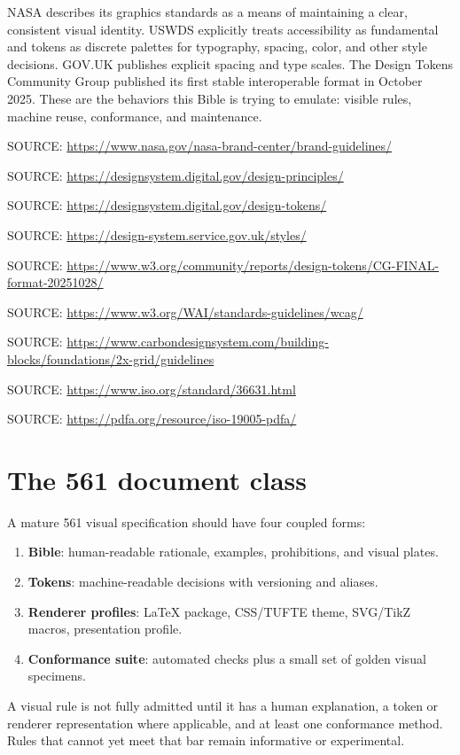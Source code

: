 \documentclass[11pt,twoside,openany]{report}
\newcommand{\Source}[1]{\par{\FSOEvidence\fontsize{7}{9}\selectfont\color{FSOInkSoft}SOURCE: \url{#1}}}
\begin{document}
\begin{evidencebox}
NASA describes its graphics standards as a means of maintaining a clear, consistent visual identity. USWDS explicitly treats accessibility as fundamental and tokens as discrete palettes for typography, spacing, color, and other style decisions. GOV.UK publishes explicit spacing and type scales. The Design Tokens Community Group published its first stable interoperable format in October 2025. These are the behaviors this Bible is trying to emulate: visible rules, machine reuse, conformance, and maintenance.
\end{evidencebox}

\Source{https://www.nasa.gov/nasa-brand-center/brand-guidelines/}
\Source{https://designsystem.digital.gov/design-principles/}
\Source{https://designsystem.digital.gov/design-tokens/}
\Source{https://design-system.service.gov.uk/styles/}
\Source{https://www.w3.org/community/reports/design-tokens/CG-FINAL-format-20251028/}
\Source{https://www.w3.org/WAI/standards-guidelines/wcag/}
\Source{https://www.carbondesignsystem.com/building-blocks/foundations/2x-grid/guidelines}
\Source{https://www.iso.org/standard/36631.html}
\Source{https://pdfa.org/resource/iso-19005-pdfa/}

\section{The 561 document class}
A mature 561 visual specification should have four coupled forms:
\begin{enumerate}
  \item \textbf{Bible}: human-readable rationale, examples, prohibitions, and visual plates.
  \item \textbf{Tokens}: machine-readable decisions with versioning and aliases.
  \item \textbf{Renderer profiles}: LaTeX package, CSS/TUFTE theme, SVG/TikZ macros, presentation profile.
  \item \textbf{Conformance suite}: automated checks plus a small set of golden visual specimens.
\end{enumerate}

\begin{specbox}
A visual rule is not fully admitted until it has a human explanation, a token or renderer representation where applicable, and at least one conformance method. Rules that cannot yet meet that bar remain informative or experimental.
\end{specbox}
\end{document}
